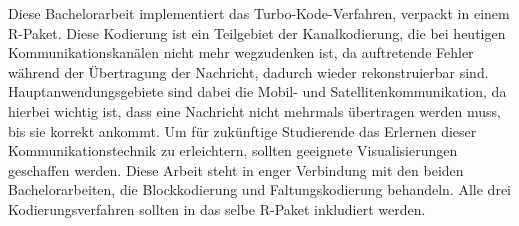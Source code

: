 Diese Bachelorarbeit implementiert das Turbo-Kode-Verfahren, verpackt in einem R-Paket. Diese Kodierung ist ein Teilgebiet der Kanalkodierung, die bei heutigen Kommunikationskanälen nicht mehr wegzudenken ist, da auftretende Fehler während der Übertragung der Nachricht, dadurch wieder rekonstruierbar sind. Hauptanwendungsgebiete sind dabei die Mobil- und Satellitenkommunikation, da hierbei wichtig ist, dass eine Nachricht nicht mehrmals übertragen werden muss, bis sie korrekt ankommt. Um für zukünftige Studierende das Erlernen dieser Kommunikationstechnik zu erleichtern, sollten geeignete Visualisierungen geschaffen werden. Diese Arbeit steht in enger Verbindung mit den beiden Bachelorarbeiten, die Blockkodierung und Faltungskodierung behandeln. Alle drei Kodierungsverfahren sollten in das selbe R-Paket inkludiert werden.
